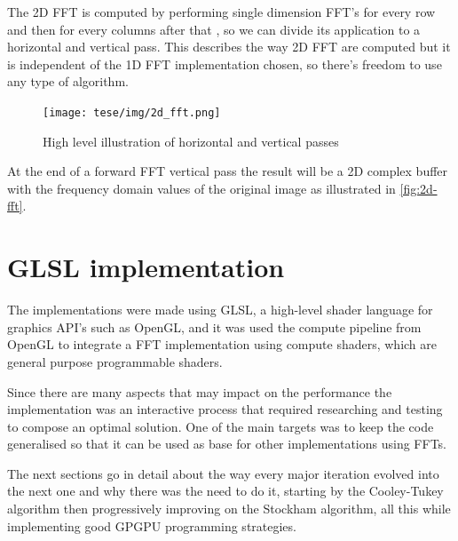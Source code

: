 \documentclass[
  oneside,
  11pt, a4paper,
  footinclude=true,
  headinclude=true,
  cleardoublepage=empty
]{scrbook}
\begin{document}
The 2D FFT is computed by performing single dimension FFT's for every row and then for every columns after that \cite{dudgeon1984multidimensional}, so we can divide its application to a horizontal and vertical pass. This describes the way 2D FFT are computed but it is independent of the 1D FFT implementation chosen, so there's freedom to use any type of algorithm.


\begin{figure}[h]
    \centering
    \texttt{[image: tese/img/2d\_fft.png]}
    \caption{High level illustration of horizontal and vertical passes}
    \label{fig:2d-fft}
\end{figure}

At the end of a forward FFT vertical pass the result will be a 2D complex buffer with the frequency domain values of the original image as illustrated in \autoref{fig:2d-fft}.


\section{GLSL implementation} \label{sec:glsl-implementation}

The implementations were made using GLSL, a high-level shader language for graphics API's such as OpenGL, and it was used the compute pipeline from OpenGL to integrate a FFT implementation using compute shaders, which are general purpose programmable shaders.

Since there are many aspects that may impact on the performance the implementation was an interactive process that required researching and testing to compose an optimal solution. One of the main targets was to keep the code generalised so that it can be used as base for other implementations using FFTs.
\newline

The next sections go in detail about the way every major iteration evolved into the next one and why there was the need to do it, starting by the Cooley-Tukey algorithm then progressively improving on the Stockham algorithm, all this while implementing good GPGPU programming strategies.

\end{document}
